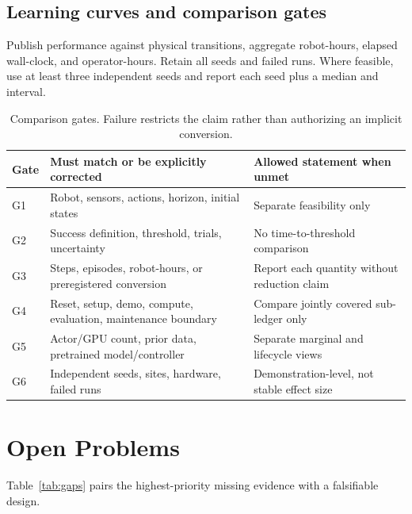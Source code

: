 \documentclass[11pt]{article}
\begin{document}
\subsection{Learning curves and comparison gates}

Publish performance against physical transitions, aggregate robot-hours, elapsed wall-clock, and operator-hours. Retain all seeds and failed runs. Where feasible, use at least three independent seeds and report each seed plus a median and interval.

\begin{table}[ht]
\centering
\caption{Comparison gates. Failure restricts the claim rather than authorizing an implicit conversion.}
\label{tab:gates}
\begin{tabularx}{\textwidth}{p{}p{}Y}
\toprule
Gate & Must match or be explicitly corrected & Allowed statement when unmet \\
\midrule
G1 & Robot, sensors, actions, horizon, initial states & Separate feasibility only \\
G2 & Success definition, threshold, trials, uncertainty & No time-to-threshold comparison \\
G3 & Steps, episodes, robot-hours, or preregistered conversion & Report each quantity without reduction claim \\
G4 & Reset, setup, demo, compute, evaluation, maintenance boundary & Compare jointly covered sub-ledger only \\
G5 & Actor/GPU count, prior data, pretrained model/controller & Separate marginal and lifecycle views \\
G6 & Independent seeds, sites, hardware, failed runs & Demonstration-level, not stable effect size \\
\bottomrule
\end{tabularx}
\end{table}

\section{Open Problems}

Table~\ref{tab:gaps} pairs the highest-priority missing evidence with a falsifiable design.
\end{document}
